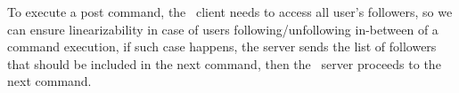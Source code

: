 To execute a post command, the \appname\ client needs to access all user's followers, so
we can ensure linearizability in case of users following/unfollowing in-between of a command execution, if such
case happens, the server sends the list of followers that should be included in the next command,
then the \appname\ server proceeds to the next command.

%

